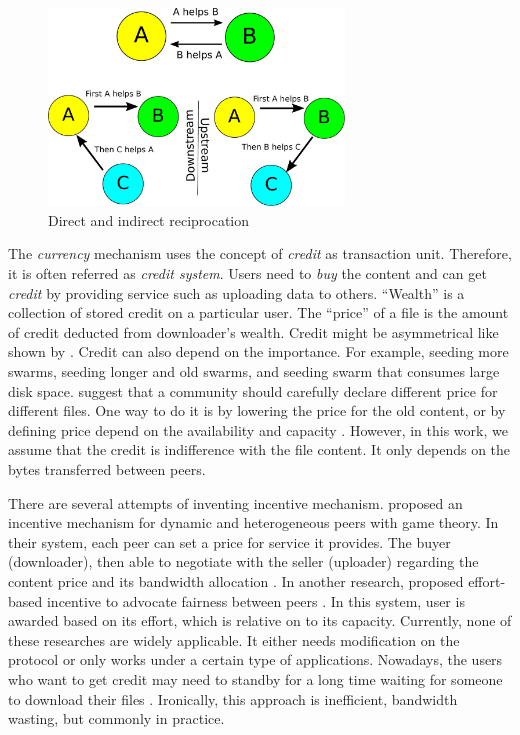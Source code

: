 \begin{figure}[t]
	\centering
	\includegraphics[width=0.7\textwidth]{pics/reciprocation.pdf}
	\caption{Direct and indirect reciprocation}
	\label{fig:reciprocation}
\end{figure}

The \textit{currency} mechanism uses the concept of \textit{credit} as transaction unit. Therefore, it is often referred as \textit{credit system}. Users need to \textit{buy} the content and can get \textit{credit} by providing service such as uploading data to others. ``Wealth'' is a collection of stored credit on a particular user. The ``price'' of a file is the amount of credit deducted from downloader's wealth. Credit might be asymmetrical like shown by \citeauthor{2012:economicbt:kash}\cite{2012:economicbt:kash}. Credit can also depend on the importance. For example, seeding more swarms, seeding longer and old swarms, and seeding swarm that consumes large disk space\cite{2014:sustainabilitytorrent:chen}. \citeauthor{2012:economicbt:kash} suggest that a community should carefully declare different price for different files. One way to do it is by lowering the price for the old content, or by defining price depend on the availability and capacity \cite{2012:economicbt:kash}. However, in this work, we assume that the credit is indifference with the file content. It only depends on the bytes transferred between peers.

There are several attempts of inventing incentive mechanism. \citeauthor{2015:incentivep2pgame:kang} proposed an incentive mechanism for dynamic and heterogeneous peers with game theory. In their system, each peer can set a price for service it provides. The buyer (downloader), then able to negotiate with the seller (uploader) regarding the content price and its bandwidth allocation \cite{2015:incentivep2pgame:kang}. In another research, \citeauthor{2010:effortincentive:rahman} proposed effort-based incentive to advocate fairness between peers \cite{2010:effortincentive:rahman}. In this system, user is awarded based on its effort, which is relative on to its capacity. Currently, none of these researches are widely applicable. It either needs modification on the protocol or only works under a certain type of applications. Nowadays, the users who want to get credit may need to standby for a long time waiting for someone to download their files \cite{2013:survivepriv:jia}. Ironically, this approach is inefficient, bandwidth wasting, but commonly in practice\cite{2013:survivepriv:jia}.

